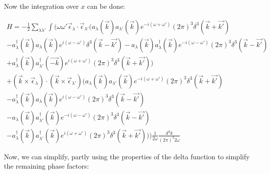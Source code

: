 \documentclass[a4]{article}
\begin{document}
    Now the integration over $x$ can be done:

    \begin{equation}
        \begin{aligned}
            H = -\frac{1}{2} \sum_{\lambda \lambda'} \int \Big( \omega \omega' \vec{\epsilon}_{\lambda} \cdot \vec{\epsilon}_{\lambda'} \big(a_{\lambda} (\vec{k}) a_{\lambda'} (\vec{k}) e^{- i (\omega + \omega')} (2 \pi)^3 \delta^{3} (\vec{k} + \vec{k'}) \\
            - a_{\lambda}^{\dagger} (\vec{k}) a_{\lambda} (\vec{k}) e^{i (\omega - \omega')} \delta^{3} (\vec{k} - \vec{k'}) - a_{\lambda} (\vec{k}) a_{\lambda}^{\dagger}  (\vec{k}) e^{- i (\omega - \omega')} (2 \pi)^3 \delta^{3} (\vec{k} - \vec{k'}) \\
            + a_{\lambda}^{\dagger} (\vec{k}) a_{\lambda'}^{\dagger} (\vec{-k}) e^{i (\omega + \omega')} (2 \pi)^3 \delta^{3} (\vec{k} + \vec{k'}) \big) \\
            + (\vec{k} \times \vec{\epsilon}_{\lambda}) \cdot (\vec{k} \times \vec{\epsilon}_{\lambda'}) \big(a_{\lambda} (\vec{k}) a_{\lambda'} (\vec{k}) e^{- i (\omega + \omega')} (2 \pi)^3 \delta^{3} (\vec{k} + \vec{k'}) \\
            - a_{\lambda}^{\dagger} (\vec{k}) a_{\lambda} (\vec{k}) e^{i (\omega - \omega')} (2 \pi)^3 \delta^{3} (\vec{k} - \vec{k'}) \\
            - a_{\lambda} (\vec{k}) a_{\lambda'}^{\dagger} (\vec{k}) e^{- i (\omega - \omega')} (2 \pi)^3 \delta^{3} (\vec{k} - \vec{k'}) \\
            - a_{\lambda}^{\dagger} (\vec{k}) a_{\lambda'}^{\dagger} (\vec{k}) e^{i (\omega + \omega')} (2 \pi)^3 \delta^{3} (\vec{k} + \vec{k'}) \big) \Big) \frac{1}{2 \omega} \frac{d^{3} k}{(2 \pi)^{3} 2 \omega}
        \end{aligned}
    \end{equation}

    Now, we can simplify, partly using the properties of the delta function to simplify the remaining phase factors:
\end{document}
